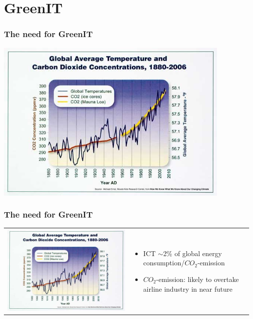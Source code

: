 \section{GreenIT}

\begin{frame}
  \frametitle{The need for GreenIT}
  \begin{center} 
   \includegraphics[width=0.87\textwidth]{images/co2temp.jpg} 
  \end{center} 
\end{frame}


\begin{frame}
  \frametitle{The need for GreenIT}
\begin{tabular}{ll}
\begin{minipage}[c]{0.3\textwidth}
\includegraphics[width=\textwidth]{images/co2temp.jpg}
\end{minipage}
&
\begin{minipage}[c]{0.7\textwidth}
  \begin{itemize}
   \item ICT $\sim$2\% of global energy consumption/$CO_2$-emission
   \item $CO_2$-emission: likely to overtake airline industry in near future
  \end{itemize}
\end{minipage}
\end{tabular}
\end{frame}

